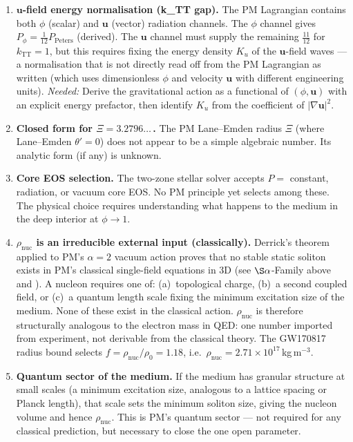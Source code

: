 \documentclass[10pt,twocolumn]{article}
\begin{document}
\begin{enumerate}
  \item \textbf{$\mathbf{u}$-field energy normalisation (k\_TT gap).}
        The PM Lagrangian contains both $\phi$ (scalar) and $\mathbf{u}$ (vector) radiation channels.
        The $\phi$ channel gives $P_\phi = \frac{1}{12}P_\mathrm{Peters}$ (derived).
        The $\mathbf{u}$ channel must supply the remaining $\frac{11}{12}$ for $k_\mathrm{TT}=1$,
        but this requires fixing the energy density $K_u$ of the $\mathbf{u}$-field waves —
        a normalisation that is not directly read off from the PM Lagrangian as written
        (which uses dimensionless $\phi$ and velocity $\mathbf{u}$ with different engineering units).
        \emph{Needed:} Derive the gravitational action as a functional of $(\phi, \mathbf{u})$
        with an explicit energy prefactor, then identify $K_u$ from the coefficient of $|\nabla\mathbf{u}|^2$.

  \item \textbf{Closed form for $\Xi = 3.2796\ldots$\,.}
        The PM Lane--Emden radius $\Xi$ (where Lane--Emden $\theta'=0$) does not
        appear to be a simple algebraic number.  Its analytic form (if any) is unknown.

  \item \textbf{Core EOS selection.}
        The two-zone stellar solver accepts $P = $ constant, radiation, or vacuum core EOS.
        No PM principle yet selects among these.  The physical choice requires understanding
        what happens to the medium in the deep interior at $\phi \to 1$.

  \item \textbf{$\rho_\mathrm{nuc}$ is an irreducible external input (classically).}
        Derrick's theorem applied to PM's $\alpha=2$ vacuum action proves that no stable
        static soliton exists in PM's classical single-field equations in 3D
        (see $\S\alpha$-Family above and ).
        A nucleon requires one of: (a)~topological charge, (b)~a second coupled field, or
        (c)~a quantum length scale fixing the minimum excitation size of the medium.
        None of these exist in the classical action.  $\rho_\mathrm{nuc}$ is therefore
        structural\-ly analogous to the electron mass in QED: one number imported from
        experiment, not derivable from the classical theory.  The GW170817 radius bound
        selects $f=\rho_\mathrm{nuc}/\rho_0=1.18$, i.e.\ $\rho_\mathrm{nuc}=2.71\times10^{17}$\,kg\,m$^{-3}$.

  \item \textbf{Quantum sector of the medium.}
        If the medium has granular structure at small scales (a minimum excitation size,
        analogous to a lattice spacing or Planck length), that scale sets the minimum
        soliton size, giving the nucleon volume and hence $\rho_\mathrm{nuc}$.
        This is PM's quantum sector — not required for any classical prediction,
        but necessary to close the one open parameter.
\end{enumerate}
\end{document}
